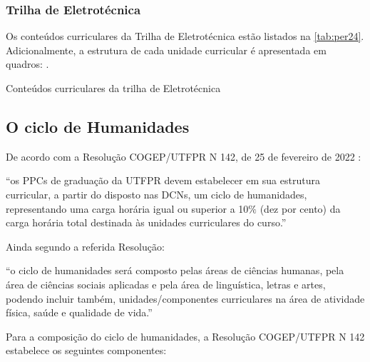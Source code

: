 \clearpage

\subsubsection{Trilha de Eletrotécnica}

Os conteúdos curriculares da Trilha de Eletrotécnica estão listados na \autoref{tab:per24}. Adicionalmente, a estrutura de cada unidade curricular é apresentada em quadros: .

\begin{table}[!htb]
	\centering\footnotesize
	\caption{Conteúdos curriculares da trilha de Eletrotécnica}
	\label{tab:per24}
\end{table}

\clearpage

\subsection{O ciclo de Humanidades}
\label{subsec:humanidades}

De acordo com a Resolução COGEP/UTFPR N\textordmasculine{} 142, de 25 de fevereiro de 2022 \cite{cogep142}:

\begin{citacao}
	``os PPCs de graduação da UTFPR devem estabelecer em sua estrutura curricular, a partir do disposto nas DCNs, um ciclo de humanidades, representando uma carga horária igual ou superior a 10$\%$ (dez por cento) da carga horária total destinada às unidades curriculares do curso.''

\end{citacao}

Ainda segundo a referida Resolução: 

\begin{citacao}
	``o ciclo de humanidades será composto pelas áreas de ciências humanas, pela área de ciências sociais aplicadas e pela área de linguística, letras e artes, podendo incluir também, unidades/componentes curriculares na área de atividade física, saúde e qualidade de vida.''
\end{citacao}

Para a composição do ciclo de humanidades, a Resolução COGEP/UTFPR N\textordmasculine{} 142 estabelece os seguintes componentes:

